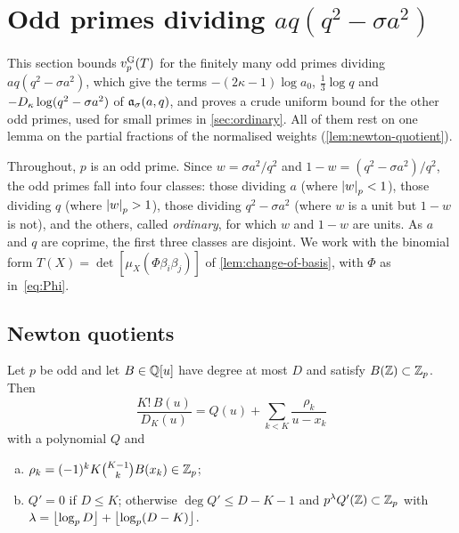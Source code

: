 \section{Odd primes dividing \texorpdfstring{$aq(q^2-\sigma a^2)$}{aq(q²-σa²)}}\label{sec:exceptional}

This section bounds $v_{p}^{\mathrm{G}}(T)$ for the finitely many odd primes dividing $aq(q^2-\sigma a^2)$,
which give the terms $-(2\kappa-1)\log a_0$, $\frac13\log q$ and $-D_\kappa\log(q^2-\sigma a^2)$ of
$\mathfrak{a}_\sigma(a,q)$, and proves a crude uniform bound for the other odd primes, used for small
primes in \cref{sec:ordinary}. All of them rest on one lemma on the partial fractions of the
normalised weights (\cref{lem:newton-quotient}).

Throughout, $p$ is an odd prime. Since $w=\sigma a^2/q^2$ and $1-w=(q^2-\sigma a^2)/q^2$, the
odd primes fall into four classes: those dividing $a$ (where $\left\lvert w\right\rvert_p<1$), those dividing $q$
(where $\left\lvert w\right\rvert_p>1$), those dividing $q^2-\sigma a^2$ (where $w$ is a unit but $1-w$ is not),
and the others, called \emph{ordinary}, for which $w$ and $1-w$ are units. As $a$ and $q$ are
coprime, the first three classes are disjoint. We work with the binomial form
$T(X)=\det[\mu_X(\Phi\beta_i\beta_j)]$ of \cref{lem:change-of-basis}, with $\Phi$ as
in~\eqref{eq:Phi}.

\subsection{Newton quotients}\label{subsec:newton}

\begin{lemma}\label{lem:newton-quotient}
Let $p$ be odd and let $B\in\mathbb{Q}[u]$ have degree at most $D$ and satisfy $B(\mathbb{Z})\subset\mathbb{Z}_p$. Then
\[
  \frac{K!\,B(u)}{D_K(u)}=Q(u)+\sum_{k<K}\frac{\rho_k}{u-x_k}
\]
with a polynomial $Q$ and
\begin{enumerate}[(a)]
\item $\rho_k=(-1)^kK\binom{K-1}{k}B(x_k)\in\mathbb{Z}_p$;
\item $Q'=0$ if $D\le K$; otherwise $\deg Q'\le D-K-1$ and $p^{\lambda}Q'(\mathbb{Z})\subset\mathbb{Z}_p$
with $\lambda=\left\lfloor \log_pD\right\rfloor+\left\lfloor \log_p(D-K)\right\rfloor$.
\end{enumerate}
\end{lemma}

